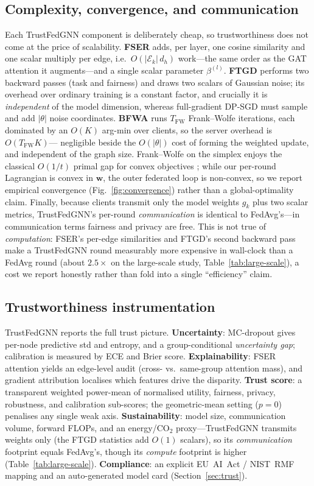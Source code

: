 \documentclass[pdflatex,sn-mathphys-num]{sn-jnl}
\theoremstyle{thmstyleone}%
\theoremstyle{thmstyletwo}%
\theoremstyle{thmstylethree}%
\begin{document}
\subsection{Complexity, convergence, and communication}
\label{sec:complexity}
Each TrustFedGNN component is deliberately cheap, so trustworthiness does not come
at the price of scalability. \textbf{FSER} adds, per layer, one cosine similarity
and one scalar multiply per edge, i.e.\ $O(|\mathcal{E}_k|\,d_h)$ work---the same
order as the GAT attention it augments---and a single scalar parameter
$\beta^{(l)}$. \textbf{FTGD} performs two backward passes (task and fairness) and
draws two scalars of Gaussian noise; its overhead over ordinary training is a
constant factor, and crucially it is \emph{independent} of the model dimension,
whereas full-gradient DP-SGD must sample and add $|\theta|$ noise coordinates.
\textbf{BFWA} runs $T_{\mathrm{FW}}$ Frank--Wolfe iterations, each dominated by an
$O(K)$ arg-min over clients, so the server overhead is $O(T_{\mathrm{FW}}K)$---
negligible beside the $O(|\theta|)$ cost of forming the weighted update, and
independent of the graph size. Frank--Wolfe on the simplex enjoys the classical
$O(1/t)$ primal gap for convex objectives \cite{jaggi2013revisiting}; while our
per-round Lagrangian is convex in $\mathbf{w}$, the outer federated loop is
non-convex, so we report empirical convergence (Fig.~\ref{fig:convergence})
rather than a global-optimality claim. Finally, because clients transmit only
the model weights $g_k$ plus two scalar metrics, TrustFedGNN's per-round
\emph{communication} is identical to FedAvg's---in communication terms fairness
and privacy are free. This is not true of \emph{computation}: FSER's per-edge
similarities and FTGD's second backward pass make a TrustFedGNN round
measurably more expensive in wall-clock than a FedAvg round (about
$2.5\times$ on the large-scale study, Table~\ref{tab:large-scale}), a cost we report
honestly rather than fold into a single ``efficiency'' claim.

\subsection{Trustworthiness instrumentation}
\label{sec:method-trust}
TrustFedGNN reports the full trust picture. \textbf{Uncertainty}: MC-dropout gives
per-node predictive std and entropy, and a group-conditional \emph{uncertainty
gap}; calibration is measured by ECE and Brier score.
\textbf{Explainability}: FSER attention yields an edge-level audit (cross- vs.\
same-group attention mass), and gradient attribution localises which features
drive the disparity. \textbf{Trust score}: a transparent weighted power-mean of
normalised utility, fairness, privacy, robustness, and calibration sub-scores;
the geometric-mean setting ($p{=}0$) penalises any single weak axis.
\textbf{Sustainability}: model size, communication volume, forward FLOPs, and an
energy/CO$_2$ proxy---TrustFedGNN transmits weights only (the FTGD statistics add
$O(1)$ scalars), so its \emph{communication} footprint equals FedAvg's, though
its \emph{compute} footprint is higher (Table~\ref{tab:large-scale}).
\textbf{Compliance}: an explicit EU~AI~Act / NIST~RMF mapping and an
auto-generated model card (Section~\ref{sec:trust}).
\end{document}
